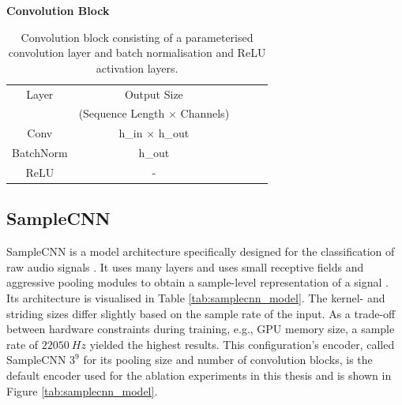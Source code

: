 

\begin{table}
    \centering
    \textbf{Convolution Block} \\
    \begin{tabular}{ccccc}
        \toprule Layer & Output Size \\
        & (Sequence Length $\times$ Channels) \\\hline
        Conv & h\_in $\times$ h\_out \\
        BatchNorm & h\_out \\
        ReLU & - \\
        \bottomrule
    \end{tabular}
    \caption{Convolution block consisting of a parameterised convolution layer and batch normalisation and ReLU activation layers.}
    \label{tab:conv_block}
\end{table}


\subsection{SampleCNN}
SampleCNN is a model architecture specifically designed for the classification of raw audio signals \cite{lee2018samplecnn}. It uses many layers and uses small receptive fields and aggressive pooling modules to obtain a sample-level representation of a signal \cite{lee2018samplecnn}. Its architecture is visualised in Table \ref{tab:samplecnn_model}. The kernel- and striding sizes differ slightly based on the sample rate of the input. As a trade-off between hardware constraints during training, e.g., GPU memory size, a sample rate of $22050~Hz$ yielded the highest results. This configuration's encoder, called SampleCNN $3^9$ for its pooling size and number of convolution blocks, is the default encoder used for the ablation experiments in this thesis and is shown in Figure \ref{tab:samplecnn_model}.


